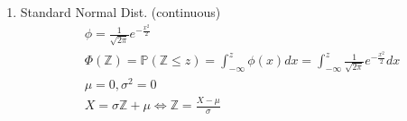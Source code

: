 \documentclass[12pt]{article}
\renewcommand{\=}[1]{\stackrel{#1}{=}} %
\theoremstyle{definition}
\theoremstyle{remark}
\begin{document}
\begin{enumerate}
\begin{align*}
    \right.\\
    &\mu = \int_{-\infty}^{\infty}f(x)dx = \int_{0}^{\infty}t\lambda
    e^{-\lambda x}dx = \frac{1}{\lambda}\\
    &\sigma^2 = \frac{1}{\lambda^2}\\
    &\textrm{Non-Poisson trials (aging): } \mathbb{P}(\mathbb{L}>t^* |
    \mathbb{L} >t_0) = e^{-\int_{t_0}^{t^*} \lambda(x)dx}
  \end{align*}
\item Standard Normal Dist. (continuous)
  \begin{align*}
    &\phi = \frac{1}{\sqrt{2\pi}}e^{-\frac{x^2}{2}} \\
    &\Phi(\mathbb{Z}) = \mathbb{P}(\mathbb{Z} \leq z) = \int_{-\infty}^z\phi(x)dx = \int_{-\infty}^z\frac{1}{\sqrt{2\pi}}e^{-\frac{x^2}{2}} dx\\
    &\mu = 0, \sigma^2 = 0\\
    & X = \sigma\mathbb{Z} + \mu \Leftrightarrow \mathbb{Z} = \frac{X-\mu}{\sigma}
  \end{align*}
\end{enumerate}
\end{document}
